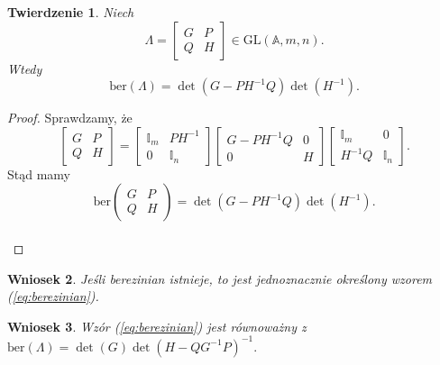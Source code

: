\documentclass[11pt,a4paper]{report}
\newtheorem{theorem}{Twierdzenie}[section]
\newtheorem{corollary}[theorem]{Wniosek}
\theoremstyle{definition}
\newcommand{\ber}{\mathrm{ber}}
\newcommand{\I}{\mathbb{I}}
\begin{document}
\begin{theorem}
	\label{thm:ber_equation}
	Niech $$\Lambda = \begin{bmatrix}
	G & P \\
	Q & H
	\end{bmatrix} \in \mathrm{GL}(\mathbb{A},m,n).$$ 
	Wtedy
	\begin{equation}
		\label{eq:berezinian}
		\ber (\Lambda) = \det(G-PH^{-1}Q)\det(H^{-1}).
	\end{equation}
\end{theorem}

\begin{proof}
	Sprawdzamy, że
	\begin{equation}
		\label{eq:smatrix_decomposition}
		\begin{bmatrix}
			G & P \\
			Q & H 
		\end{bmatrix}
		=
		\begin{bmatrix}
			\I_m & PH^{-1} \\
			0    & \I_n    
		\end{bmatrix}
		\begin{bmatrix}
			G-PH^{-1}Q & 0 \\
			0          & H 
		\end{bmatrix}
		\begin{bmatrix}
			\I_m    & 0    \\
			H^{-1}Q & \I_n 
		\end{bmatrix}\!\!.
	\end{equation}
	Stąd mamy $$\ber \left( \begin{matrix}
	G & P \\
	Q & H
	\end{matrix} \right) = \det(G-PH^{-1}Q) \det(H^{-1}).$$\\[-24pt]
\end{proof}

\begin{corollary}
	Jeśli berezinian istnieje, to jest jednoznacznie określony wzorem (\ref{eq:berezinian}).
\end{corollary}

\begin{corollary}
	Wzór (\ref{eq:berezinian}) jest równoważny z $\ber (\Lambda) = \det(G)\det(H-QG^{-1}P)^{-1}.$
\end{corollary}
\end{document}
